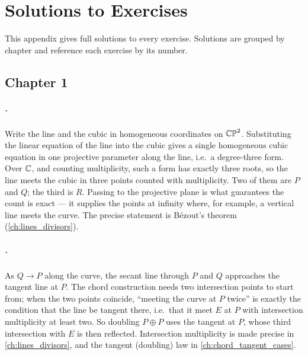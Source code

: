 \chapter{Solutions to Exercises}
\label{app:D}

This appendix gives full solutions to every exercise. Solutions are grouped by
chapter and reference each exercise by its number.

\section{Chapter 1}
\label{sec:soln-ch1}

\paragraph{.}
Write the line and the cubic in homogeneous coordinates on \(\mathbb{CP}^2\).
Substituting the linear equation of the line into the cubic gives a single
homogeneous cubic equation in one projective parameter along the line, i.e.\ a
degree-three form. Over \(\mathbb{C}\), and counting multiplicity, such a form has
exactly three roots, so the line meets the cubic in three points counted with
multiplicity. Two of them are \(P\) and \(Q\); the third is \(R\). Passing to
the projective plane is what guarantees the count is exact --- it supplies the
points at infinity where, for example, a vertical line meets the curve. The
precise statement is B\'ezout's theorem (\cref{ch:lines_divisors}).

\paragraph{.}
As \(Q \to P\) along the curve, the secant line through \(P\) and \(Q\)
approaches the tangent line at \(P\). The chord construction needs two
intersection points to start from; when the two points coincide, ``meeting the
curve at \(P\) twice'' is exactly the condition that the line be tangent there,
i.e.\ that it meet \(E\) at \(P\) with intersection multiplicity at least two.
So doubling \(P \oplus P\) uses the tangent at \(P\), whose third intersection
with \(E\) is then reflected. Intersection multiplicity is made precise in
\cref{ch:lines_divisors}, and the tangent (doubling) law in
\cref{ch:chord_tangent_cases}.

